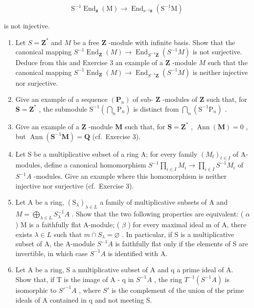 \[
\mathrm{S} ^ {- 1} \operatorname{End} _ {\mathbf {z}} (\mathrm{M}) \rightarrow \operatorname{End} _ {\mathrm{s} ^ {- 1} \mathbf {z}} (\mathrm{S} ^ {- 1} \mathrm{M})
\]

is not injective.

\begin{enumerate}
\def\labelenumi{\arabic{enumi}.}
\setcounter{enumi}{3}
\item
  Let \(S = \mathbf{Z}^*\) and \(M\) be a free \(\mathbf{Z}\) -module with infinite basis. Show that the canonical mapping \(S^{-1}\operatorname{End}_{\mathbf{Z}}(M) \to \operatorname{End}_{S^{-1}\mathbf{Z}}(S^{-1}M)\) is not surjective. Deduce from this and Exercise 3 an example of a \(\mathbf{Z}\) -module \(M\) such that the canonical mapping \(S^{-1}\operatorname{End}_{\mathbf{Z}}(M) \to \operatorname{End}_{S^{-1}\mathbf{Z}}(S^{-1}M)\) is neither injective nor surjective.
\item
  Give an example of a sequence \((\mathbf{P}_n)\) of sub- \(\mathbf{Z}\) -modules of \(\mathbf{Z}\) such that, for \(\mathbf{S} = \mathbf{Z}^*\) , the submodule \(\mathrm{S}^{-1}\left(\bigcap_{n} \mathrm{P}_{n}\right)\) is distinct from \(\bigcap_{n} (\mathrm{S}^{-1}\mathrm{P}_{n})\) .
\item
  Give an example of a \(\mathbf{Z}\) -module \(\mathbf{M}\) such that, for \(\mathbf{S} = \mathbf{Z}^*\) , \(\operatorname{Ann}(\mathbf{M}) = 0\) , but \(\operatorname{Ann}(\mathbf{S}^{-1}\mathbf{M}) = \mathbf{Q}\) (cf.~Exercise 3).
\item
  Let S be a multiplicative subset of a ring A; for every family \((M_{t})_{t\in I}\) of A-modules, define a canonical homomorphism \(S^{-1}\prod_{i\in I}M_{i}\to\prod_{i\in I}S^{-1}M_{i}\) of \(S^{-1}A\) -modules. Give an example where this homomorphism is neither injective nor surjective (cf.~Exercise 3).
\item
  Let A be a ring, \((\mathrm{S}_{\lambda})_{\lambda \in L}\) a family of multiplicative subsets of A and \(M = \bigoplus_{\lambda \in L} S_{\lambda}^{-1}A\) . Show that the two following properties are equivalent: ( \(\alpha\) ) M is a faithfully flat A-module; ( \(\beta\) ) for every maximal ideal m of A, there exists \(\lambda \in L\) such that \(m \cap S_{\lambda} = \varnothing\) . In particular, if S is a multiplicative subset of A, the A-module \(S^{-1}A\) is faithfully flat only if the elements of S are invertible, in which case \(S^{-1}A\) is identified with A.
\item
  Let A be a ring, S a multiplicative subset of A and q a prime ideal of A. Show that, if T is the image of A - q in \(S^{-1}A\) , the ring \(T^{-1}(S^{-1}A)\) is isomorphic to \(S'^{-1}A\) , where \(S'\) is the complement of the union of the prime ideals of A contained in q and not meeting S.

\end{enumerate}
